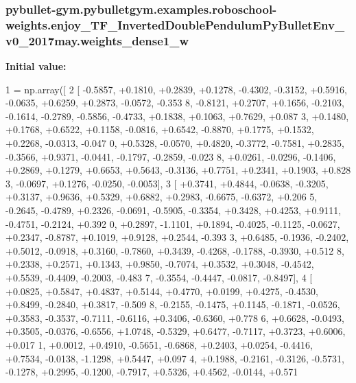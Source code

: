 \subsubsection[{\texorpdfstring{weights\+\_\+dense1\+\_\+w}{weights_dense1_w}}]{\setlength{\rightskip}{0pt plus 5cm}pybullet-\/gym.\+pybulletgym.\+examples.\+roboschool-\/weights.\+enjoy\+\_\+\+T\+F\+\_\+\+Inverted\+Double\+Pendulum\+Py\+Bullet\+Env\+\_\+v0\+\_\+2017may.\+weights\+\_\+dense1\+\_\+w}\hypertarget{namespacepybullet-gym_1_1pybulletgym_1_1examples_1_1roboschool-weights_1_1enjoy___t_f___inverted4815cf8a7bea8454ae92c5ac92dac9b4_a2db40f8db227746e1b4c6c9c5ee83680}{}\label{namespacepybullet-gym_1_1pybulletgym_1_1examples_1_1roboschool-weights_1_1enjoy___t_f___inverted4815cf8a7bea8454ae92c5ac92dac9b4_a2db40f8db227746e1b4c6c9c5ee83680}
{\bfseries Initial value\+:}
\begin{DoxyCode}
1 = np.array([
2 [ -0.5857, +0.1810, +0.2839, +0.1278, -0.4302, -0.3152, +0.5916, -0.0635, +0.6259, +0.2873, -0.0572, -0.353
      8, -0.8121, +0.2707, +0.1656, -0.2103, -0.1614, -0.2789, -0.5856, -0.4733, +0.1838, +0.1063, +0.7629, +0.087
      3, +0.1480, +0.1768, +0.6522, +0.1158, -0.0816, +0.6542, -0.8870, +0.1775, +0.1532, +0.2268, -0.0313, -0.047
      0, +0.5328, -0.0570, +0.4820, -0.3772, -0.7581, +0.2835, -0.3566, +0.9371, -0.0441, -0.1797, -0.2859, -0.023
      8, +0.0261, -0.0296, -0.1406, +0.2869, +0.1279, +0.6653, +0.5643, -0.3136, +0.7751, +0.2341, +0.1903, +0.828
      3, -0.0697, +0.1276, -0.0250, -0.0053],
3 [ +0.3741, +0.4844, -0.0638, -0.3205, +0.3137, +0.9636, +0.5329, +0.6882, +0.2983, -0.6675, -0.6372, +0.206
      5, -0.2645, -0.4789, +0.2326, -0.0691, -0.5905, -0.3354, +0.3428, +0.4253, +0.9111, -0.4751, -0.2124, +0.392
      0, +0.2897, -1.1101, +0.1894, -0.4025, -0.1125, -0.0627, +0.2347, -0.8787, +0.1019, +0.9128, +0.2544, -0.393
      3, +0.6485, -0.1936, -0.2402, +0.5012, -0.0918, +0.3160, -0.7860, +0.3439, -0.4268, -0.1788, -0.3930, +0.512
      8, +0.2338, +0.2571, +0.1343, +0.9850, -0.7074, +0.3532, +0.3048, -0.4542, +0.5539, -0.4409, -0.2003, -0.483
      7, -0.3554, -0.4447, -0.0817, -0.8497],
4 [ +0.0825, +0.5847, +0.4837, +0.5144, +0.4770, +0.0199, +0.4275, -0.4530, +0.8499, -0.2840, +0.3817, -0.509
      8, -0.2155, -0.1475, +0.1145, -0.1871, -0.0526, +0.3583, -0.3537, -0.7111, -0.6116, +0.3406, -0.6360, +0.778
      6, +0.6628, -0.0493, +0.3505, -0.0376, -0.6556, +1.0748, -0.5329, +0.6477, -0.7117, +0.3723, +0.6006, +0.017
      1, +0.0012, +0.4910, -0.5651, -0.6868, +0.2403, +0.0254, -0.4416, +0.7534, -0.0138, -1.1298, +0.5447, +0.097
      4, +0.1988, -0.2161, -0.3126, -0.5731, -0.1278, +0.2995, -0.1200, -0.7917, +0.5326, +0.4562, -0.0144, +0.571

\end{DoxyCode}
